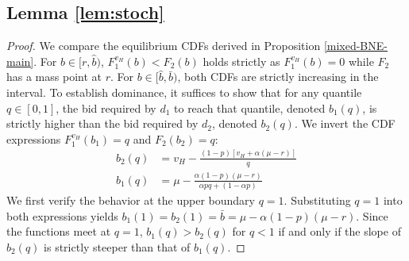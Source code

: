 \documentclass[11pt]{article}
\theoremstyle{plain}
\theoremstyle{definition}
\theoremstyle{plain}
\theoremstyle{plain}
\theoremstyle{plain}
\theoremstyle{plain}
\numberwithin{equation}{section}
\begin{document}
\vspace{3mm}

\subsection*{Lemma \ref{lem:stoch}}

\begin{proof}
We compare the equilibrium CDFs derived in Proposition \ref{mixed-BNE-main}. For $b \in [r, \hat{b})$, $F_1^{v_H}(b) < F_2(b)$ holds strictly as $F_1^{v_H}(b) = 0$ while $F_2$ has a mass point at $r$. For $b \in [\hat{b}, \bar{b})$, both CDFs are strictly increasing in the interval. To establish dominance, it suffices to show that for any quantile $q \in [0, 1]$, the bid required by $d_1$ to reach that quantile, denoted $b_1(q)$, is strictly higher than the bid required by $d_2$, denoted $b_2(q)$. We invert the CDF expressions $F_1^{v_H}(b_1) = q$ and $F_2(b_2) = q$:
\begin{align*}
    b_2(q) &= v_H - \frac{(1-p)[v_H+\alpha(\mu-r)]}{q} \\[5pt]
    b_1(q) &= \mu - \frac{\alpha(1-p)(\mu-r)}{\alpha p q + (1-\alpha p)}
\end{align*}
We first verify the behavior at the upper boundary $q=1$. Substituting $q=1$ into both expressions yields $b_1(1) = b_2(1) = \bar{b} = \mu - \alpha(1-p)(\mu-r)$. Since the functions meet at $q=1$, $b_1(q) > b_2(q)$ for $q < 1$ if and only if the slope of $b_2(q)$ is strictly steeper than that of $b_1(q)$.
\vspace{2mm}


\end{proof}
\end{document}
